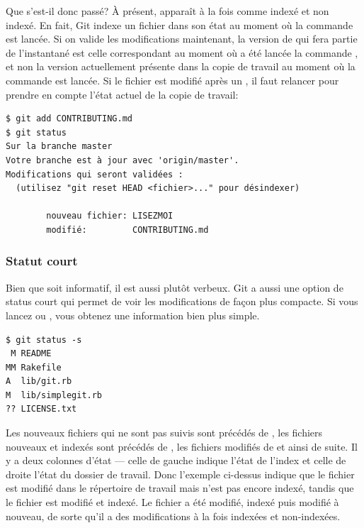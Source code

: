 Que s'est-il donc passé?
À présent,  apparaît à la fois comme indexé et non indexé.
En fait, Git indexe un fichier dans son état au moment où la commande  est lancée.
Si on valide les modifications maintenant, la version de  qui fera partie de l'instantané est celle correspondant au moment où a été lancée la commande , et non la version actuellement présente dans la copie de travail au moment où la commande  est lancée.
Si le fichier est modifié après un , il faut relancer  pour prendre en compte l'état actuel de la copie de travail:
\begin{Schunk}
\begin{Verbatim}
$ git add CONTRIBUTING.md
$ git status
Sur la branche master
Votre branche est à jour avec 'origin/master'.
Modifications qui seront validées :
  (utilisez "git reset HEAD <fichier>..." pour désindexer)

        nouveau fichier: LISEZMOI
        modifié:         CONTRIBUTING.md

\end{Verbatim}
\end{Schunk}

\subsubsection{Statut court}

Bien que  soit informatif, il est aussi plutôt verbeux.
Git a aussi une option de status court qui permet de voir les modifications de façon plus compacte.
Si vous lancez  ou , vous obtenez une information bien plus simple.

\begin{Schunk}
\begin{Verbatim}
$ git status -s
 M README
MM Rakefile
A  lib/git.rb
M  lib/simplegit.rb
?? LICENSE.txt
\end{Verbatim}
\end{Schunk}

Les nouveaux fichiers qui ne sont pas suivis sont précédés de , les fichiers nouveaux et indexés sont précédés de , les fichiers modifiés de  et ainsi de suite.
Il y a deux colonnes d'état --- celle de gauche indique l'état de l'index et celle de droite l'état du dossier de travail.
Donc l'exemple ci-dessus indique que le fichier  est modifié dans le répertoire de travail mais n'est pas encore indexé, tandis que le fichier  est modifié et indexé.
Le fichier  a été modifié, indexé puis modifié à nouveau, de sorte qu'il a des modifications à la fois indexées et non-indexées.

